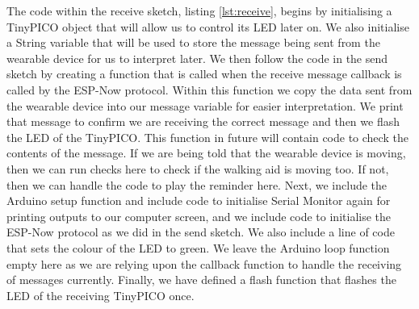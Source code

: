 \documentclass[12pt, a4paper]{report}
\begin{document}
{The code within the receive sketch, listing \ref{lst:receive}, begins by initialising a TinyPICO object that will allow us to control its LED later on. We also initialise a String variable that will be used to store the message being sent from the wearable device for us to interpret later. We then follow the code in the send sketch by creating a function that is called when the receive message callback is called by the ESP-Now protocol. Within this function we copy the data sent from the wearable device into our message variable for easier interpretation. We print that message to confirm we are receiving the correct message and then we flash the LED of the TinyPICO. This function in future will contain code to check the contents of the message. If we are being told that the wearable device is moving, then we can run checks here to check if the walking aid is moving too. If not, then we can handle the code to play the reminder here. Next, we include the Arduino setup function and include code to initialise Serial Monitor again for printing outputs to our computer screen, and we include code to initialise the ESP-Now protocol as we did in the send sketch. We also include a line of code that sets the colour of the LED to green. We leave the Arduino loop function empty here as we are relying upon the callback function to handle the receiving of messages currently. Finally, we have defined a flash function that flashes the LED of the receiving TinyPICO once.

\printbibliography

}
\end{document}
